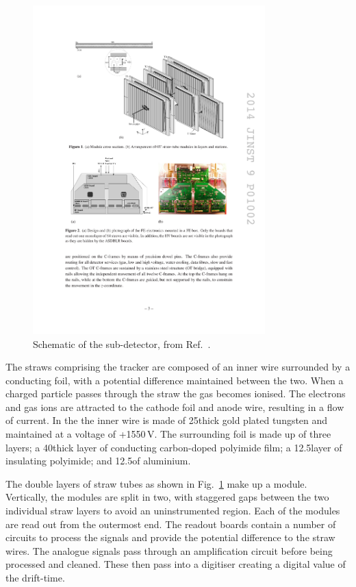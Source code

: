 \begin{figure}[!h]
    \centering
    \includegraphics[width=0.8\textwidth]{figs/Detector/ot_layout.pdf}
    \caption{Schematic of the \ot sub-detector, from Ref.~\cite{LHCb-DP-2013-003}.}
    \label{fig:Dec_ot_schematic}   
\end{figure}
 
The straws comprising the tracker are composed of an inner wire surrounded by a conducting foil, with a potential difference maintained between the two. When a charged particle passes through the straw the gas becomes ionised. The electrons and gas ions are attracted to the cathode foil and anode wire, resulting in a flow of current. In the \ot the inner wire is made of 25\mum thick gold plated tungsten and maintained at a voltage of +1550\,V. The surrounding foil is made up of three layers; a 40\mum thick layer of conducting carbon-doped polyimide film; a 12.5\mum layer of insulating polyimide; and 12.5\mum of aluminium. 

The double layers of straw tubes as shown in Fig.~\ref{fig:Dec_ot_schematic} make up a module. Vertically, the modules are split in two, with staggered gaps between the two individual straw layers to avoid an uninstrumented region. Each of the modules are read out from the outermost end. 
The readout boards contain a number of circuits to process the signals and provide the potential difference to the straw wires.
The analogue signals pass through an amplification circuit before being processed and cleaned. These then pass into a digitiser creating a digital value of the drift-time.   

